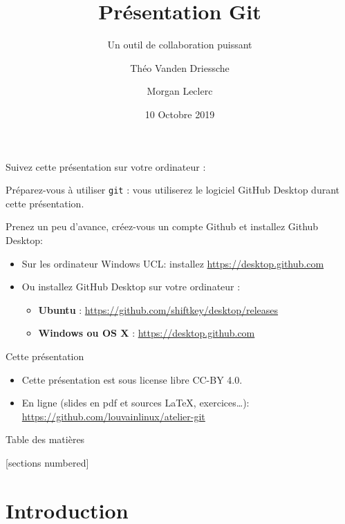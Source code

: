 \documentclass{beamer}
\title{Présentation Git}
\subtitle{Un outil de collaboration puissant}
\date{10 Octobre 2019}
\author{Théo Vanden Driessche \and Morgan Leclerc}
\institute{KAP Louvain-li-Nux}
\begin{document}
\begin{frame}
\begin{center}
  Suivez cette présentation sur votre ordinateur :

\end{center}

Préparez-vous à utiliser \texttt{git} :
vous utiliserez le logiciel GitHub Desktop durant cette présentation.

Prenez un peu d'avance, créez-vous un compte Github et installez Github Desktop:
\begin{itemize}
    \item Sur les ordinateur Windows UCL: installez
            \url{https://desktop.github.com}
    \item Ou installez GitHub Desktop sur votre ordinateur :
        \begin{itemize}\label{install}
        \item \textbf{Ubuntu} : {\footnotesize{\url{https://github.com/shiftkey/desktop/releases}}}
        \item \textbf{Windows ou OS X} : \url{https://desktop.github.com}
    \end{itemize}
\end{itemize}
\end{frame}


\maketitle

\begin{frame}{Cette présentation}
    \begin{itemize}
        \item Cette présentation est sous license libre CC-BY 4.0.
        \item En ligne (slides en pdf et sources \LaTeX, exercices\ldots):
            \url{https://github.com/louvainlinux/atelier-git}
    \end{itemize}
\end{frame}

\begin{frame}{Table des matières}

[sections numbered]
\tableofcontents[hideallsubsections]

\end{frame}

\section{Introduction}
\end{document}
